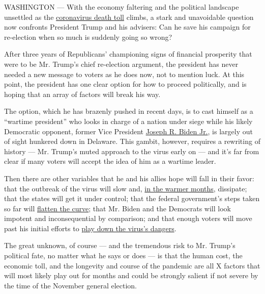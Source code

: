 WASHINGTON --- With the economy faltering and the political landscape
unsettled as the
\href{https://www.nytimes3xbfgragh.onion/2020/03/25/podcasts/the-daily/trump-coronavirus.html?action=click\&module=Briefings\&pgtype=Homepage}{coronavirus
death toll} climbs, a stark and unavoidable question now confronts
President Trump and his advisers: Can he save his campaign for
re-election when so much is suddenly going so wrong?

After three years of Republicans' championing signs of financial
prosperity that were to be Mr. Trump's chief re-election argument, the
president has never needed a new message to voters as he does now, not
to mention luck. At this point, the president has one clear option for
how to proceed politically, and is hoping that an array of factors will
break his way.

The option, which he has brazenly pushed in recent days, is to cast
himself as a ``wartime president'' who looks in charge of a nation under
siege while his likely Democratic opponent, former Vice President
\href{https://www.nytimes3xbfgragh.onion/interactive/2020/us/elections/joe-biden.html}{Joseph
R. Biden Jr.}, is largely out of sight hunkered down in Delaware. This
gambit, however, requires a rewriting of history --- Mr. Trump's muted
approach to the virus early on --- and it's far from clear if many
voters will accept the idea of him as a wartime leader.

Then there are other variables that he and his allies hope will fall in
their favor: that the outbreak of the virus will slow and,
\href{https://www.nytimes3xbfgragh.onion/2020/03/22/health/warm-weather-coronavirus.html}{in
the warmer months}, dissipate; that the states will get it under
control; that the federal government's steps taken so far will
\href{https://www.nytimes3xbfgragh.onion/interactive/2020/03/19/world/coronavirus-flatten-the-curve-countries.html}{flatten
the curve}; that Mr. Biden and the Democrats will look impotent and
inconsequential by comparison; and that enough voters will move past his
initial efforts to
\href{https://www.nytimes3xbfgragh.onion/interactive/2020/03/18/us/trump-coronavirus-statements-timeline.html}{play
down the virus's dangers}.

The great unknown, of course --- and the tremendous risk to Mr. Trump's
political fate, no matter what he says or does --- is that the human
cost, the economic toll, and the longevity and course of the pandemic
are all X factors that will most likely play out for months and could be
strongly salient if not severe by the time of the November general
election.

